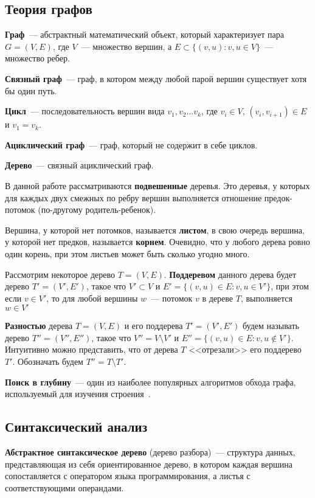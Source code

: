 \subsection{Теория графов}

\textbf{Граф}~--- абстрактный математический объект, который характеризует 
пара $G = (V, E)$, где $V$~--- множество вершин, а $E \subset \{(v, u): v, u \in V\}$~--- множество ребер. 

\textbf{Связный граф}~--- граф, в котором между любой парой вершин существует хотя бы один путь.

\textbf{Цикл}~--- последовательность вершин вида $v_1, v_2 \dots v_k$, где $v_i \in V$, 
$(v_i, v_{i+1}) \in E$ и $v_1 = v_k$.

\textbf{Ациклический граф}~--- граф, который не содержит в себе циклов.

\textbf{Дерево}~--- связный ациклический граф.

В данной работе рассматриваются \textbf{подвешенные} деревья. Это деревья, у которых для каждых двух смежных по ребру
вершин выполняется отношение предок-потомок (по-другому родитель-ребенок).

Вершина, у которой нет потомков, называется \textbf{листом}, в свою очередь вершина, у которой нет предков,
называется \textbf{корнем}. Очевидно, что у любого дерева ровно один корень, при этом листьев может быть сколько угодно много.

Рассмотрим некоторое дерево $T = (V, E)$. \textbf{Поддеревом} данного дерева будет дерево $T' = (V', E')$, такое что
$V' \subset V$ и $E' = \{(v, u) \in E : v, u \in V'\}$, при этом если $v \in V'$, то для любой
вершины $w$~--- потомок $v$ в дереве $T$, выполняется $w \in V'$

\textbf{Разностью} дерева $T = (V, E)$ и его поддерева $T' = (V', E')$ будем называть дерево $T'' = (V'', E'')$,
такое что $V'' = V \setminus V'$ и $E'' = \{(v, u) \in E : v, u \notin V'\}$. Интуитивно можно представить, что от дерева
$T$ <<отрезали>> его поддерево $T'$. Обозначать будем $T'' = T \setminus T'$.


\textbf{Поиск в глубину}~--- один из наиболее популярных алгоритмов обхода графа, используемый для изучения строения~\cite{cormen}. 

\subsection{Синтаксический анализ}

\textbf{Абстрактное синтаксическое дерево} (дерево разбора)~--- структура данных, представляющая из себя ориентированное дерево, 
в котором каждая вершина сопоставляется с оператором языка программирования, а листья с соответствующими операндами. 

